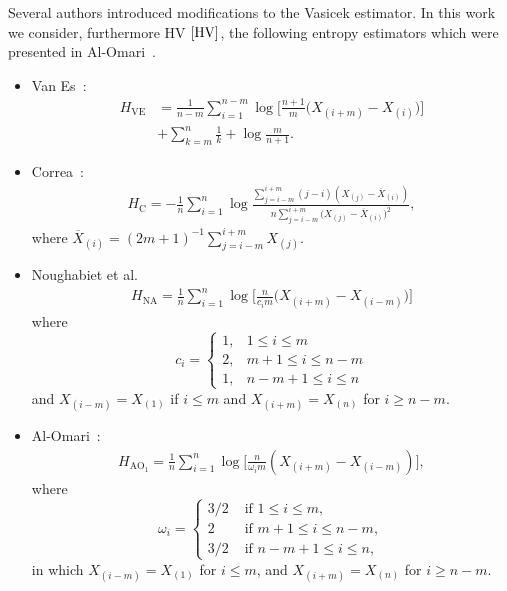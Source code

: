\documentclass[journal]{IEEEtran}
\begin{document}
	Several authors introduced modifications to the Vasicek estimator. In this work we consider, furthermore HV$~\eqref{HV}$,  the following entropy estimators which were presented in Al-Omari~\cite{AlOmari2016}. 
	\begin{itemize}
		\item Van Es~\cite{VanEs92}:
		\begin{align}
			\label{HVE}
			H_\text{VE}&=\frac{1}{n-m} \sum_{i=1}^{n-m}\log{\Big[\frac{n+1}{m}\big(X_{(i+m)}-X_{(i)}\big)\Big]} \nonumber\\
			&+\sum_{k=m}^{n} \frac{1}{k}+\log \frac{m}{n+1}.
		\end{align}
		\item Correa~\cite{Correa95}:
		\begin{align}
			\label{HC}
			H_\text{C}=-\frac{1}{n} \sum_{i=1}^{n} \log \frac{\sum_{j=i-m}^{i+m}(j-i)\left(X_{(j)}-\overline{X}_{(i)}\right)}{n \sum_{j=i-m}^{i+m}\big(X_{(j)}-\overline{X}_{(i)}\big)^{2}},
		\end{align}
		where $\overline{X}_{(i)}=(2 m+1)^{-1} \sum_{j=i-m}^{i+m} X_{(j)}$.
		\item Noughabiet et al.~\cite{Noughabi2010} 
		\label{HNA}
		\begin{align}
        H_\text{NA}=\frac{1}{n} \sum_{i=1}^{n} \log \Big[\frac{n}{c_{i} m}\big(X_{(i+m)}-X_{(i-m)}\big)\Big]
        \end{align}
        where 
        \begin{equation*}
        c_{i}=\left\{\begin{array}{ll}
        1, & 1 \leq i \leq m \\
        2, & m+1 \leq i \leq n-m \\
        1, & n-m+1 \leq i \leq n
        \end{array}\right.
\end{equation*}
and $X_{(i-m)}=X_{(1)}$ if $i \leq m$ and $X_{(i+m)}=X_{(n)}$ for $i \geq n-m .$ 
		\item Al-Omari~\cite{AlOmari2014}:
		\begin{align}
			H_{{\text{AO}}_1}=\frac{1}{n} \sum_{i=1}^{n} \log \Big[\frac{n}{\omega_{i} m}\left(X_{(i+m)}-X_{(i-m)}\right)\Big], 
			\label{AHE}
		\end{align}
		where
		\begin{equation*}
			\omega_{i}= \begin{cases}
				3/2 & \text{ if }1 \leq i \leq m, \\
				2 & \text{ if } m+1 \leq i \leq n-m, \\
				3/2 & \text{ if } n-m+1 \leq i \leq n,
			\end{cases}
		\end{equation*}
		in which $X_{(i-m)}=X_{(1)}$ for $i \leq m$, and $X_{(i+m)}=X_{(n)}$ for $i \geq n-m$. 
		

\end{itemize}
\end{document}
